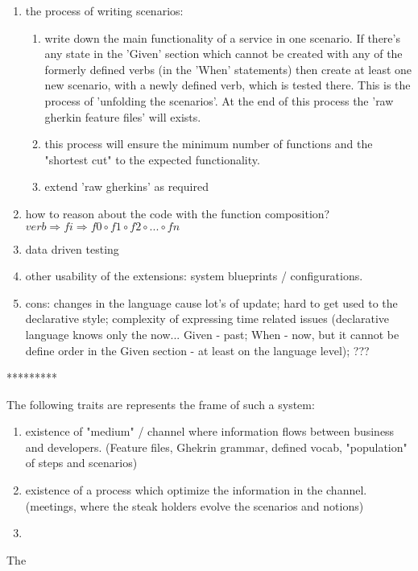 \documentclass[conference]{IEEEtran}
\begin{document}
\begin{enumerate}
\begin{enumerate}
        \end{enumerate}
    \item the process of writing scenarios:
        \begin{enumerate}
            \item write down the main functionality of a service in one scenario. If there's any state in the 'Given' section which cannot be created with any of the formerly defined verbs (in the 'When' statements) then create at least one new scenario, with a newly defined verb, which is tested there. This is the process of 'unfolding the scenarios'. At the end of this process the 'raw gherkin feature files' will exists.
            \item this process will ensure the minimum number of functions and the "shortest cut" to the expected functionality.
            \item extend 'raw gherkins' as required
        \end{enumerate}
    \item how to reason about the code with the function composition? \( verb   \Rightarrow fi \Rightarrow f0 \circ f1 \circ f2 \circ ... \circ fn \)
    \item data driven testing
    \item other usability of the extensions: system blueprints / configurations.
    \item cons: changes in the language cause lot's of update; hard to get used to the declarative style; complexity of expressing time related issues (declarative language knows only the now... Given - past; When - now, but it cannot be define order in the Given section - at least on the language level); ???
\end{enumerate}


*********

The following traits are represents the frame of such a system:
\begin{enumerate}
  \item existence of "medium" / channel where information flows between business and developers. (Feature files, Ghekrin grammar, defined vocab, "population" of steps and scenarios)
  \item existence of a process which optimize the information in the channel. (meetings, where the steak holders evolve the scenarios and notions)
  \item 
\end{enumerate}

The 
\end{document}
